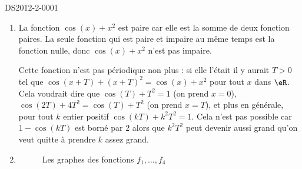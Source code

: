 \begin{corrige}{DS2012-2-0001}

\begin{enumerate}  
  \item La fonction $\cos(x)+x^2$ est paire car elle est la somme de deux fonction paires. La seule fonction qui est paire et impaire au m\^eme temps est la fonction nulle, donc $\cos(x)+x^2$ n'est pas impaire. 

    Cette fonction n'est pas p\'eriodique non plus : si elle l'\'etait il y aurait $T> 0$ tel que $\cos(x+T)+(x+T)^2 = \cos(x)+x^2$ pour tout $x$ dans $\eR$. Cela voudrait dire que  $\cos(T)+T^2 = 1$ (on prend $x=0$), $\cos(2T)+4T^2=\cos(T)+T^2$ (on prend $x= T$), et plus en générale, pour tout $k$ entier positif $ \cos(kT)+k^2T^2=1$. Cela n'est pas possible car $1-\cos(kT)$ est borné par $2$ alors que $k^2T^2$ peut devenir aussi grand qu'on veut quitte à prendre $k$ assez grand.   

  \item 
    \begin{figure}[ht!]
      \begin{center}
      \end{center}
      \caption{Les graphes des fonctions $f_1,\ldots, f_4$}
      
    \end{figure}
    
  \end{enumerate}
\end{corrige}
